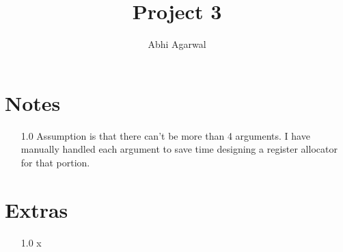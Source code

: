 \documentclass[11pt, oneside]{article}
\title{Project 3}
\author{Abhi Agarwal}
\date{}
\begin{document}
\maketitle

\section*{Notes}

\begin{enumerate}
\item[1.0] Assumption is that there can't be more than 4 arguments. I have manually handled each argument to save time designing a register allocator for that portion.
\end{enumerate}

\section*{Extras}

\begin{enumerate}
\item[1.0] x
\end{enumerate}
\end{document}
